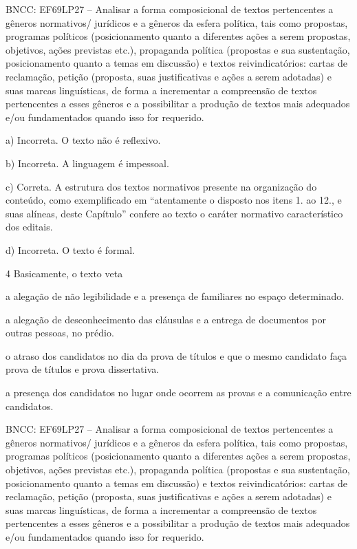 BNCC: EF69LP27 -- Analisar a forma composicional de textos pertencentes
a gêneros normativos/ jurídicos e a gêneros da esfera política, tais
como propostas, programas políticos (posicionamento quanto a diferentes
ações a serem propostas, objetivos, ações previstas etc.), propaganda
política (propostas e sua sustentação, posicionamento quanto a temas em
discussão) e textos reivindicatórios: cartas de reclamação, petição
(proposta, suas justificativas e ações a serem adotadas) e suas marcas
linguísticas, de forma a incrementar a compreensão de textos
pertencentes a esses gêneros e a possibilitar a produção de textos mais
adequados e/ou fundamentados quando isso for requerido.

a) Incorreta. O texto não é reflexivo.

b) Incorreta. A linguagem é impessoal.

c) Correta. A estrutura dos textos normativos presente na organização do
conteúdo, como exemplificado em ``atentamente o disposto nos itens 1. ao
12., e suas alíneas, deste Capítulo'' confere ao texto o caráter
normativo característico dos editais.

d) Incorreta. O texto é formal.

\num{4} Basicamente, o texto veta

\begin{escolha}
\item a alegação de não legibilidade e a presença de familiares no espaço
determinado.

\item a alegação de desconhecimento das cláusulas e a entrega de
documentos por outras pessoas, no prédio.

\item o atraso dos candidatos no dia da prova de títulos e que o mesmo
candidato faça prova de títulos e prova dissertativa.

\item a presença dos candidatos no lugar onde ocorrem as provas e a
comunicação entre candidatos.
\end{escolha}

BNCC: EF69LP27 -- Analisar a forma composicional de textos pertencentes
a gêneros normativos/ jurídicos e a gêneros da esfera política, tais
como propostas, programas políticos (posicionamento quanto a diferentes
ações a serem propostas, objetivos, ações previstas etc.), propaganda
política (propostas e sua sustentação, posicionamento quanto a temas em
discussão) e textos reivindicatórios: cartas de reclamação, petição
(proposta, suas justificativas e ações a serem adotadas) e suas marcas
linguísticas, de forma a incrementar a compreensão de textos
pertencentes a esses gêneros e a possibilitar a produção de textos mais
adequados e/ou fundamentados quando isso for requerido.

